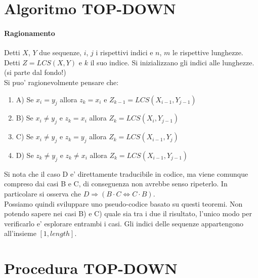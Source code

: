 \section{Algoritmo TOP-DOWN}

\paragraph{Ragionamento}

Detti $X$, $Y$ due sequenze, $i$, $j$ i rispettivi indici e $n$, $m$ le rispettive lunghezze.
Detti $Z = LCS(X, Y)$ e $k$ il suo indice. Si inizializzano gli indici alle lunghezze. (si parte dal fondo!) \\

Si puo' ragionevolmente pensare che:

\begin{enumerate}

\item A) Se $x_{i} = y_{j}$ allora $z_{k} = x_{i}$ e $Z_{k-1} = LCS(X_{i-1}, Y_{j-1})$

\item B) Se $x_{i} \ne y_{j}$ e $z_{k} = x_{i}$ allora $Z_{k}= LCS(X_{i}, Y_{j-1})$

\item C) Se $x_{i} \ne y_{j}$ e $z_{k} = y_{j}$ allora $Z_{k}= LCS(X_{i-1}, Y_{j})$

\item D) Se $z_{k} \ne y_{j}$ e $z_{k} \ne x_{i}$ allora $Z_{k} = LCS(X_{i-1}, Y_{j-1})$

\end{enumerate}

Si nota che il caso D e' direttamente traducibile in codice, ma viene comunque compreso dai casi B e C, di conseguenza non avrebbe senso ripeterlo.
In particolare si osserva che $D \Rightarrow (B \cdot C \Leftrightarrow C \cdot B)$. \\

Possiamo quindi sviluppare uno pseudo-codice basato su questi teoremi.
Non potendo sapere nei casi B) e C) quale sia tra i due il risultato, l'unico modo per verificarlo e' esplorare entrambi i casi.
Gli indici delle sequenze appartengono all'insieme $[1, length]$.

\newpage

\section{Procedura TOP-DOWN}

